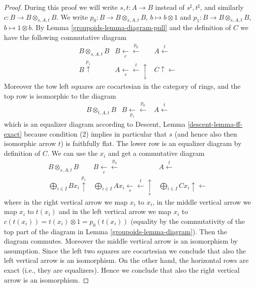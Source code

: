 \begin{proof}

During this proof we will write $s, t : A \to B$ instead of
$s^\sharp, t^\sharp$, and similarly $c : B \to B \otimes_{s, A, t} B$.
We write $p_0 : B \to B \otimes_{s, A, t} B$, $b \mapsto b \otimes 1$ and
$p_1 : B \to B \otimes_{s, A, t} B$, $b \mapsto 1 \otimes b$. By
Lemma \ref{groupoids-lemma-diagram-pull}
and the definition of $C$ we have the following
commutative diagram
$$
\begin{array}{ccc}B \otimes_{s, A, t} B & B \underset{c}{\longleftarrow}\overset{p_0}{\longleftarrow} & A \overset{t}{\longleftarrow} \\ B \overset{p_1}{\uparrow} & A \underset{s}{\longleftarrow}\overset{t}{\longleftarrow}\underset{s}{\uparrow} & C \uparrow\longleftarrow\end{array}
$$
Moreover the tow left squares are cocartesian in the category of rings, and
the top row is isomorphic to the diagram
$$
\begin{array}{ccc}B \otimes_{t, A, t} B & B \underset{p_1}{\longleftarrow}\overset{p_0}{\longleftarrow} & A \overset{t}{\longleftarrow}\end{array}
$$
which is an equalizer diagram according to
Descent, Lemma \ref{descent-lemma-ff-exact} because condition (2) implies
in particular that $s$ (and hence also then isomorphic arrow $t$)
is faithfully flat.
The lower row is an equalizer diagram by definition of $C$.
We can use the $x_i$ and get a commutative diagram
$$
\begin{array}{ccc}B \otimes_{s, A, t} B & B \underset{c}{\longleftarrow}\overset{p_0}{\longleftarrow} & A \overset{t}{\longleftarrow} \\ \bigoplus_{i \in I} B x_i \overset{p_1}{\uparrow} & \bigoplus_{i \in I} A x_i \underset{s}{\longleftarrow}\overset{t}{\longleftarrow}\underset{s}{\uparrow} & \bigoplus_{i \in I} C x_i \uparrow\longleftarrow\end{array}
$$
where in the right vertical arrow we map $x_i$ to $x_i$,
in the middle vertical arrow we map $x_i$ to $t(x_i)$ and
in the left vertical arrow we map $x_i$ to
$c(t(x_i)) = t(x_i) \otimes 1 = p_0(t(x_i))$ (equality by the commutativity
of the top part of the diagram in Lemma \ref{groupoids-lemma-diagram}). Then the diagram
commutes. Moreover the middle vertical arrow is an isomorphism
by assumption. Since the left two squares are cocartesian we
conclude that also the left vertical arrow is an isomorphism.
On the other hand, the horizontal rows are exact (i.e., they are
equalizers). Hence we conclude that also the right vertical arrow
is an isomorphism.
\end{proof}

